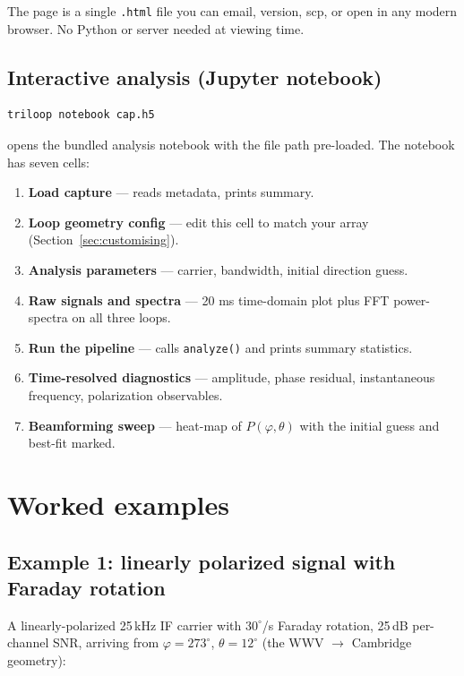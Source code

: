\documentclass[11pt]{article}
\begin{document}
The page is a single \texttt{.html} file you can email, version, scp,
or open in any modern browser.  No Python or server needed at
viewing time.

\subsection{Interactive analysis (Jupyter notebook)}

\begin{lstlisting}[style=shell]
triloop notebook cap.h5
\end{lstlisting}

opens the bundled analysis notebook with the file path pre-loaded.
The notebook has seven cells:

\begin{enumerate}\itemsep=2pt
\item \textbf{Load capture} --- reads metadata, prints summary.
\item \textbf{Loop geometry config} --- edit this cell to match your
      array (Section~\ref{sec:customising}).
\item \textbf{Analysis parameters} --- carrier, bandwidth, initial
      direction guess.
\item \textbf{Raw signals and spectra} --- 20 ms time-domain plot plus
      FFT power-spectra on all three loops.
\item \textbf{Run the pipeline} --- calls \texttt{analyze()} and prints
      summary statistics.
\item \textbf{Time-resolved diagnostics} --- amplitude, phase residual,
      instantaneous frequency, polarization observables.
\item \textbf{Beamforming sweep} --- heat-map of $P(\varphi, \theta)$
      with the initial guess and best-fit marked.
\end{enumerate}

\section{Worked examples}

\subsection{Example 1: linearly polarized signal with Faraday rotation}

A linearly-polarized 25\,kHz IF carrier with $30^\circ$/s Faraday
rotation, 25\,dB per-channel SNR, arriving from $\varphi=273^\circ$,
$\theta=12^\circ$ (the WWV $\rightarrow$ Cambridge geometry):
\end{document}

